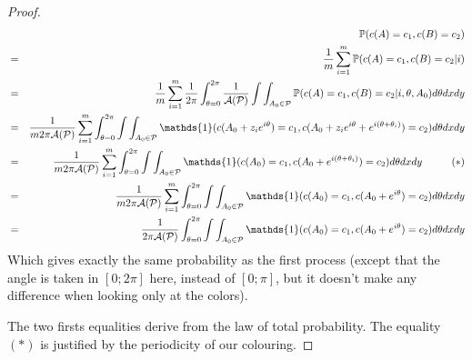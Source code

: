 \documentclass[a4paper,11pt]{article}
\begin{document}
\begin{proof}
\begin{eqnarray*}
& & \mathbb{P}(c(A) = c_1, c(B) = c_2) \\
  &=& \frac{1}{m}\sum_{i=1}^{m} \mathbb{P}(c(A) = c_1, c(B) = c_2 | i)  \\
  &=& \frac{1}{m}\sum_{i=1}^{m}  \frac{1}{2\pi}\int_{\theta =0} ^{2\pi} \frac{1}{\mathcal{A(P)}}\int\int_{A_0 \in \mathcal{P}} \mathbb{P}(c(A) = c_1, c(B) = c_2 | i, \theta, A_0) d\theta dx dy \\  
  &=& \frac{1}{m 2\pi \mathcal{A(P)}}\sum_{i=1}^{m}\int_{\theta =0} ^{2\pi} \int\int_{A_0 \in \mathcal{P}} \mathds{1}(c(A_0 + z_i e^{i\theta}) = c_1, c(A_0 +z_i e^{i\theta} + e^{i (\theta + \theta_i)}) = c_2) d\theta dx dy \\  
    &=& \frac{1}{m 2\pi \mathcal{A(P)}}\sum_{i=1}^{m} \int_{\theta =0} ^{2\pi} \int\int_{A_0 \in \mathcal{P}} \mathds{1}(c(A_0) = c_1, c(A_0 + e^{i (\theta + \theta_i)}) = c_2 ) d\theta dx dy \hspace{1 cm} (*)\\ 
    &=& \frac{1}{m 2\pi \mathcal{A(P)}}\sum_{i=1}^{m} \int_{\theta =0} ^{2\pi} \int\int_{A_0 \in \mathcal{P}} \mathds{1}(c(A_0) = c_1, c(A_0 + e^{i \theta}) = c_2 ) d\theta dx dy \\ 
    &=& \frac{1}{2\pi \mathcal{A(P)}}\int_{\theta =0} ^{2\pi} \int\int_{A_0 \in \mathcal{P}} \mathds{1}(c(A_0) = c_1, c(A_0 + e^{i \theta}) = c_2 ) d\theta dx dy \\ 
\end{eqnarray*}
Which gives exactly the same probability as the first process (except that the angle is taken in $[0;2\pi]$ here, instead of $[0;\pi]$, but it doesn't make any difference when looking only at the colors).

The two firsts equalities derive from the law of total probability.
The equality $(*)$ is justified by the periodicity of our colouring.
\end{proof}
\end{document}
